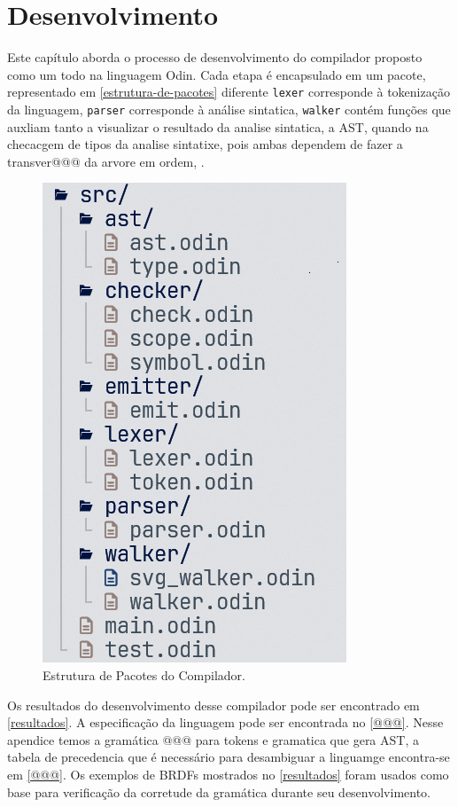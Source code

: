 
\chapter{Desenvolvimento}

Este capítulo aborda o processo de desenvolvimento do compilador proposto como um todo na linguagem Odin.
Cada etapa é encapsulado em um pacote, representado em \autoref{estrutura-de-pacotes} diferente \texttt{lexer} corresponde à tokenização da linguagem, \texttt{parser} corresponde à análise sintatica, \texttt{walker} contém funções que auxliam tanto a visualizar o resultado da analise sintatica, a AST, quando na checacgem de tipos da analise sintatixe, pois ambas dependem de fazer a transver@@@ da arvore em ordem, \texttt{}
\texttt{}.

\begin{figure}[H]
  \caption{\label{estrutura-de-pacotes} \small Estrutura de Pacotes do Compilador.}
  \begin{center}
    \includegraphics[scale=0.5]{./Imagens/package-structure}
  \end{center}
\end{figure}

Os resultados do desenvolvimento desse compilador pode ser encontrado em \autoref{resultados}.
A especificação da linguagem pode ser encontrada no \autoref{@@@}. Nesse apendice temos a gramática @@@ para tokens e gramatica que gera AST, a tabela de precedencia que é necessário para desambiguar a linguamge encontra-se em \autoref{@@@}.
Os exemplos de BRDFs mostrados no \autoref{resultados} foram usados como base para verificação da corretude da gramática durante seu desenvolvimento. 

